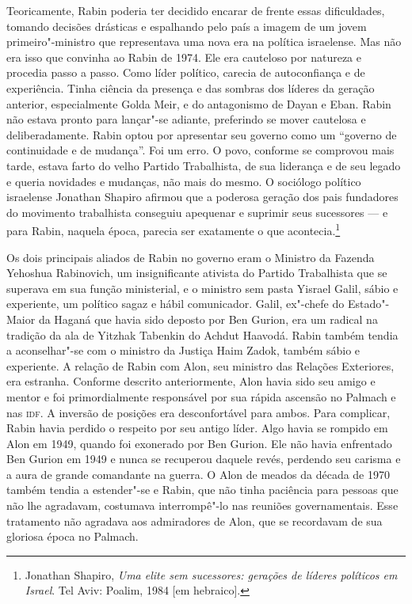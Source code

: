 Teoricamente, Rabin poderia ter decidido encarar de frente essas
dificuldades, tomando decisões drásticas e espalhando pelo país a imagem
de um jovem primeiro"-ministro que representava uma nova era na política
israelense. Mas não era isso que convinha ao Rabin de 1974. Ele era
cauteloso por natureza e procedia passo a passo. Como líder político,
carecia de autoconfiança e de experiência. Tinha ciência da presença e
das sombras dos líderes da geração anterior, especialmente Golda Meir, e
do antagonismo de Dayan e Eban. Rabin não estava pronto para lançar"-se
adiante, preferindo se mover cautelosa e deliberadamente. Rabin optou
por apresentar seu governo como um ``governo de continuidade e de
mudança''. Foi um erro. O povo, conforme se comprovou mais tarde,
estava farto do velho Partido Trabalhista, de sua liderança e de seu
legado e queria novidades e mudanças, não mais do mesmo. O sociólogo
político israelense Jonathan Shapiro afirmou que a poderosa geração dos
pais fundadores do movimento trabalhista conseguiu apequenar e suprimir
seus sucessores --- e para Rabin, naquela época, parecia ser exatamente o
que acontecia.\footnote{Jonathan Shapiro, \emph{Uma elite sem sucessores: gerações de líderes políticos em Israel}. Tel Aviv: Poalim, 1984 {[}em hebraico{]}.}

Os dois principais aliados de Rabin no governo eram o Ministro da
Fazenda Yehoshua Rabinovich, um insignificante ativista do Partido
Trabalhista que se superava em sua função ministerial, e o ministro sem
pasta Yisrael Galil, sábio e experiente, um político sagaz e hábil
comunicador. Galil, ex"-chefe do Estado"-Maior da Haganá que havia sido
deposto por Ben Gurion, era um radical na tradição da ala de Yitzhak
Tabenkin do Achdut Haavodá. Rabin também tendia a aconselhar"-se com o
ministro da Justiça Haim Zadok, também sábio e experiente. A relação de
Rabin com Alon, seu ministro das Relações Exteriores, era estranha.
Conforme descrito anteriormente, Alon havia sido seu amigo e mentor e
foi primordialmente responsável por sua rápida ascensão no Palmach e nas
\textsc{idf}. A inversão de posições era desconfortável para ambos. Para
complicar, Rabin havia perdido o respeito por seu antigo líder. Algo
havia se rompido em Alon em 1949, quando foi exonerado por Ben Gurion.
Ele não havia enfrentado Ben Gurion em 1949 e nunca se recuperou daquele
revés, perdendo seu carisma e a aura de grande comandante na guerra. O
Alon de meados da década de 1970 também tendia a estender"-se e Rabin,
que não tinha paciência para pessoas que não lhe agradavam, costumava
interrompê"-lo nas reuniões governamentais. Esse tratamento não agradava
aos admiradores de Alon, que se recordavam de sua gloriosa época no Palmach.

